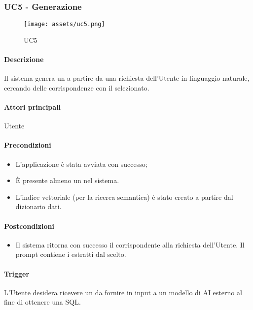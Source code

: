 \subsubsection{UC5 - Generazione }\label{UC5}

\begin{figure}[H]
  \centering
  \texttt{[image: assets/uc5.png]}
  \caption{UC5}
\end{figure}

\paragraph*{Descrizione}
Il sistema genera un  a partire da una richiesta dell'Utente in linguaggio naturale, cercando delle corrispondenze con il  selezionato.

\paragraph*{Attori principali}
Utente

\paragraph*{Precondizioni}
\begin{itemize}
  \item L'applicazione è stata avviata con successo;
  \item È presente almeno un  nel sistema.
  \item L'indice vettoriale (per la ricerca semantica) è stato creato a partire dal dizionario dati.
\end{itemize}

\paragraph*{Postcondizioni}
\begin{itemize}
  \item Il sistema ritorna con successo il  corrispondente alla richiesta dell'Utente. Il prompt contiene i  estratti dal  scelto.
\end{itemize}

\paragraph*{Trigger}
L'Utente desidera ricevere un  da fornire in input a un modello di AI esterno al fine di ottenere una  SQL.

